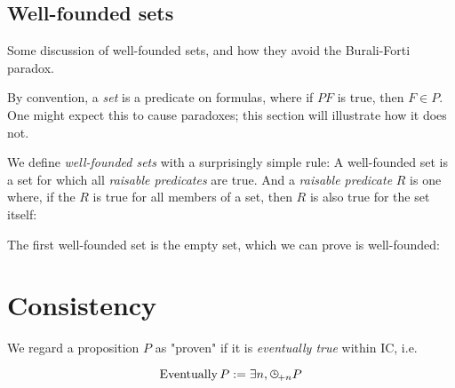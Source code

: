\documentclass{article}
\begin{document}

  \subsection{Well-founded sets}

  Some discussion of well-founded sets, and how they avoid the Burali-Forti paradox.
  
  By convention, a \emph{set} is a predicate on formulas, where if $PF$ is true, then $F \in P$. One might expect this to cause paradoxes; this section will illustrate how it does not.
  
  We define \emph{well-founded sets} with a surprisingly simple rule: A well-founded set is a set for which all \emph{raisable predicates} are true. And a \emph{raisable predicate} $R$ is one where, if the $R$ is true for all members of a set, then $R$ is also true for the set itself:

  
  The first well-founded set is the empty set, which we can prove is well-founded:
  
%
%
%
%

  \section{Consistency}\label{consistency}
  
  We regard a proposition $P$ as "proven" if it is \emph{eventually true} within IC, i.e.
  
  \newcommand{\eventually}{\operatorname{\mathrm{Eventually}}}
  
  \[ \eventually P := \exists n, \clocksub{+n} P \]
  
\end{document}
